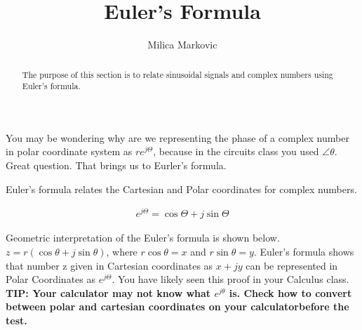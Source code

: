 \documentclass{ximera}
\title{Euler's Formula}
\author{Milica Markovic}
\begin{document}
  
\begin{abstract}  
The purpose of this section is to relate sinusoidal signals and complex numbers using Euler's formula.
\end{abstract}  
\maketitle    
  



You may be wondering why are we representing the phase of a complex number in polar coordinate system as  $r e^{j \Theta}$, because in the circuits class you used $\angle \theta$. Great question. That brings us to Eurler's formula.

  
  

 Euler's formula relates the Cartesian and Polar coordinates for complex numbers.

\begin{eqnarray}
 e^{j \Theta} =  \cos \Theta + j  \sin \Theta
\end{eqnarray}

Geometric interpretation of the Euler's formula is shown below. $z=r ( \cos{\theta} + j \sin{\theta})$, where $r \cos{\theta}=x$ and $r \sin{\theta}=y$. Euler's formula shows that number z given in Cartesian coordinates as $x+jy$ can be represented in Polar Coordinates as   $e^{j \Theta}$. You have likely seen this proof in your Calculus class.  {\bf TIP: Your calculator may not know what $e^{j\theta}$ is. Check how to convert between polar and cartesian coordinates on your calculatorbefore the test.}
\end{document}
